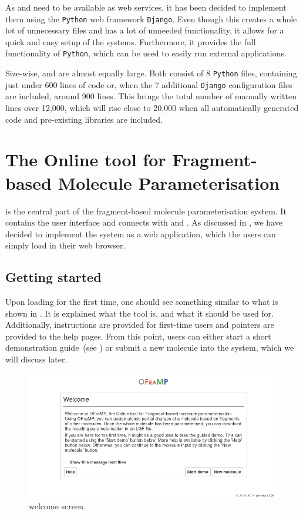 As \oapoc{} and \omfraf{} need to be available as web services, it has been decided to implement them using the \verb|Python| web framework \verb|Django|. Even though this creates a whole lot of unnecessary files and has a lot of unneeded functionality, it allows for a quick and easy setup of the systems. Furthermore, it provides the full functionality of \verb|Python|, which can be used to easily run external applications.

Size-wise, \oapoc{} and \omfraf{} are almost equally large. Both consist of 8 \verb|Python| files, containing just under 600 lines of code or, when the 7 additional \verb|Django| configuration files are included, around 900 lines. This brings the total number of manually written lines over 12,000, which will rise close to 20,000 when all automatically generated code and pre-existing libraries are included.



\section[\oframp]{The Online tool for Fragment-based Molecule Parameterisation}
\oframp{} is the central part of the fragment-based molecule parameterisation system. It contains the user interface and connects with \oapoc{} and \omfraf{}. As discussed in , we have decided to implement the system as a web application, which the users can simply load in their web browser.


\subsection{Getting started}
Upon loading \oframp{} for the first time, one should see something similar to what is shown in . It is explained what the tool is, and what it should be used for. Additionally, instructions are provided for first-time users and pointers are provided to the help pages. From this point, users can either start a short demonstration guide~(see ) or submit a new molecule into the system, which we will discuss later.

\begin{figure}
\center
\includegraphics[width=.9\textwidth]{img/impl_welcome.png}
\caption{\oframp{} welcome screen.}
\end{figure}

